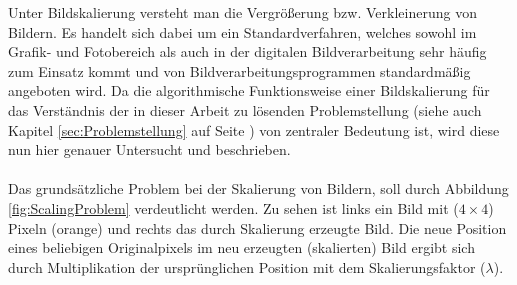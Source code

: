 \documentclass[
fontsize=10pt, 
listof = totoc,
parskip = half	
]{report}
\begin{document}
Unter Bildskalierung versteht man die Vergrößerung bzw. Verkleinerung von Bildern. Es handelt sich dabei um ein Standardverfahren, welches sowohl im Grafik- und Fotobereich als auch in der digitalen Bildverarbeitung sehr häufig zum Einsatz kommt und von Bildverarbeitungsprogrammen standardmäßig angeboten wird. Da die algorithmische Funktionsweise einer Bildskalierung für das Verständnis der in dieser Arbeit zu lösenden Problemstellung (siehe auch Kapitel \ref{sec:Problemstellung} auf Seite \pageref{sec:Problemstellung}) von zentraler Bedeutung ist, wird diese nun hier genauer Untersucht und beschrieben.
\\\\
Das grundsätzliche Problem bei der Skalierung von Bildern, soll durch Abbildung \ref{fig:ScalingProblem} verdeutlicht werden. Zu sehen ist links ein Bild mit ($4\times 4$) Pixeln (orange) und rechts das durch Skalierung erzeugte Bild. Die neue Position eines beliebigen Originalpixels im neu erzeugten (skalierten) Bild ergibt sich durch Multiplikation der ursprünglichen Position mit dem Skalierungsfaktor ($\lambda$).
\end{document}
